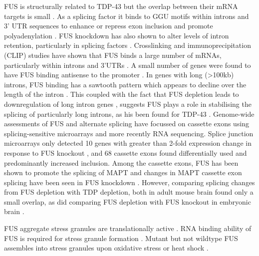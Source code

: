 FUS is structurally related to TDP-43 but the overlap between their mRNA targets is small \citep{Lagier-Tourenne2012-wa,Rogelj2012,Colombrita2012, Honda2014}. 
As a splicing factor it binds to GGU motifs within introns and 3' UTR sequences to enhance or repress exon inclusion and promote polyadenylation \citep{Rogelj2012,Lagier-Tourenne2012-wa}.
FUS knockdown has also shown to alter levels of intron retention, particularly in splicing factors \citep{VanBlitterswijk2013, Nakaya2013}.
Crosslinking and immunoprecipitation (CLIP) studies have shown that FUS binds a large number of mRNAs, particularly within introns and 3'UTRs \citep{Lagier-Tourenne2012,Rogelj2012,Ishigaki2012}.
A small number of genes were found to have FUS binding antisense to the promoter \citep{Ishigaki2012}.
In genes with long (>100kb) introns, FUS binding has a sawtooth pattern which appears to decline over the length of the intron \citep{Rogelj2012}. 
This coupled with the fact that FUS depletion leads to downregulation of long intron genes \citep{Lagier-Tourenne2012}, suggests FUS plays a role in stabilising the splicing of particularly long introns, as his been found for TDP-43 \citep{Polymenidou2011}.
Genome-wide assessments of FUS and alternate splicing have focussed on cassette exons using splicing-sensitive microarrays and more recently RNA sequencing. 
Splice junction microarrays only detected 10 genes with greater than 2-fold expression change in response to FUS knockout \citep{Rogelj2012}, and 68 cassette exons found differentially used and predominantly increased inclusion. 
Among the cassette exons, FUS has been shown to promote the splicing of MAPT \citep{Orozco2012} and changes in MAPT cassette exon splicing have been seen in FUS knockdown \citep{Ishigaki2012, Scekic-zahirovic2016}.
However, comparing splicing changes from FUS depletion with TDP depletion, both in adult mouse brain found only a small overlap, as did comparing FUS depletion with FUS knockout in embryonic brain  \citep{Lagier-Tourenne2012}.



FUS aggregate stress granules are translationally active \citep{Yasuda2013}.
RNA binding ability of FUS is required for stress granule formation \citep{Daigle2013}.
Mutant but not wildtype FUS assembles into stress granules upon oxidative stress or heat shock \citep{Bosco2010}.



